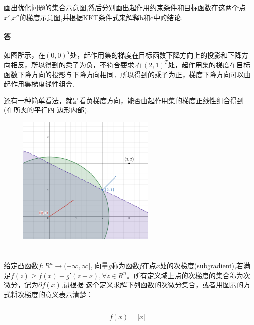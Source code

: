 \documentclass[a4paper]{article}
\begin{document}
\subsection{}
画出优化问题的集合示意图,然后分别画出起作用约束条件和目标函数在这两个点$x'$,\(x''\)的梯度示意图,并根据KKT条件式来解释b和c中的结论.

\paragraph{答}

如图所示，在$(0,0)^T$处，起作用集的梯度在目标函数下降方向上的投影和下降方向相反，所以得到的乘子为负，不符合要求.在$(2,1)^T$处，起作用集的梯度在目标函数下降方向的投影与下降方向相同，所以得到的乘子为正，梯度下降方向可以由起作用集梯度线性组合.

还有一种简单看法，就是看负梯度方向，能否由起作用集的梯度正线性组合得到(在所夹的平行四
边形内部).

\begin{figure}[H]
   \centering
   \includegraphics[width=0.6\textwidth]{pic/p7.png}
\end{figure}

\section{}
给定凸函数$f:R^n\rightarrow (−\infty,\infty]$, 向量$g$称为函数$f$在点$x$处的次梯度(subgradient),若满足\(f(z)\geq f(x) +g'(z −x),\forall z \in R^n\)。所有定义域上点的次梯度的集合称为次微分，记为$\partial f(x)$,试根据
这个定义求解下列函数的次微分集合，或者用图示的方式将次梯度的意义表示清楚：

\subsection{}
\[f(x) = |x|\]
\end{document}
